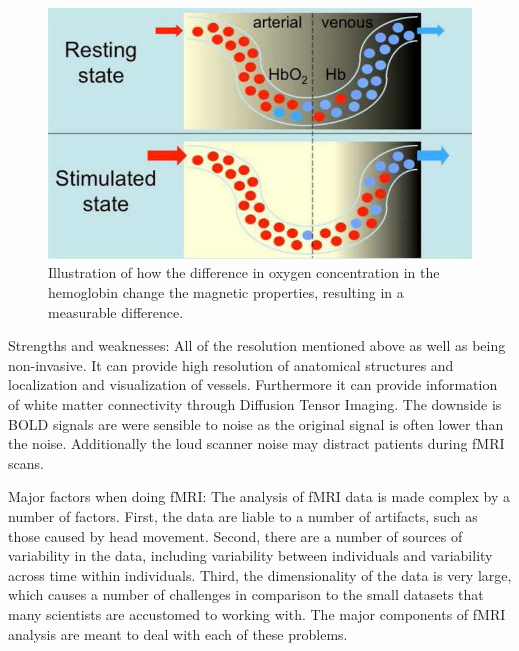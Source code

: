 \begin{figure}[H]                 
	\includegraphics[width=.52\textwidth]{figures/aBackground/bold_response}  
	\caption{Illustration of how the difference in oxygen concentration in the hemoglobin change the magnetic properties, resulting in a measurable difference\cite{Glover2011}.}
	\label{fig:back:bold} 
\end{figure}


Strengths and weaknesses: All of the resolution mentioned above as well as being non-invasive. It can provide high resolution of anatomical structures and localization and visualization of vessels. Furthermore it can provide information of white matter connectivity through Diffusion Tensor Imaging. The downside is BOLD signals are were sensible to noise as the original signal is often lower than the noise. Additionally the loud scanner noise may distract patients during fMRI scans. 
\cite{Glover2011}

Major factors when doing fMRI:
The analysis of fMRI data is made complex by a number of factors. First, the data are liable to a number of artifacts, such as those caused by head movement. Second, there are a number of sources of variability in the data, including variability between individuals and variability across time within individuals. Third, the dimensionality of the data is very large, which causes a number of challenges in comparison to the small datasets that many scientists are accustomed to working with. The major components of fMRI analysis are meant to deal with each of these problems. \cite{Glover2011} 
